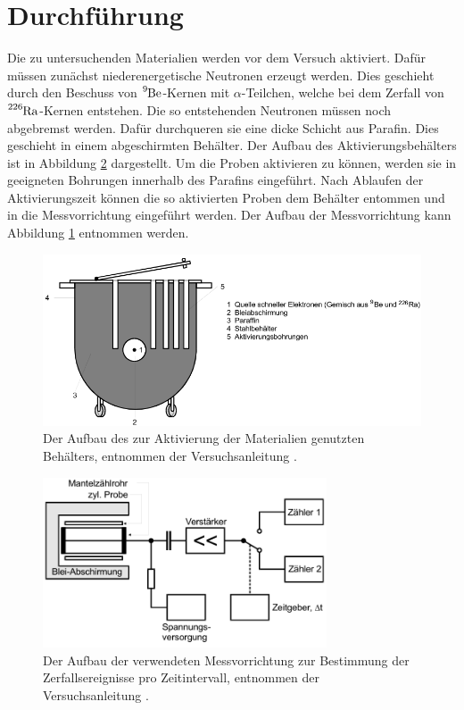 \section{Durchführung}
\label{sec:Durchführung}

Die zu untersuchenden Materialien werden vor dem Versuch aktiviert.
Dafür müssen zunächst niederenergetische Neutronen erzeugt werden.
Dies geschieht durch den Beschuss von $\ce{^{9}Be}$-Kernen mit $\alpha$-Teilchen, welche bei dem Zerfall von $\ce{^{226}Ra}$-Kernen entstehen.
Die so entstehenden Neutronen müssen noch abgebremst werden.
Dafür durchqueren sie eine dicke Schicht aus Parafin.
Dies geschieht in einem abgeschirmten Behälter.
Der Aufbau des Aktivierungsbehälters ist in Abbildung \ref{fig:Aktivierungsbehälter} dargestellt.
Um die Proben aktivieren zu können, werden sie in geeigneten Bohrungen innerhalb des Parafins eingeführt.
Nach Ablaufen der Aktivierungszeit können die so aktivierten Proben dem Behälter entommen und in die Messvorrichtung eingeführt werden.
Der Aufbau der Messvorrichtung kann Abbildung \ref{fig:Aufbau} entnommen werden.
\FloatBarrier
\begin{figure}
  \centering
  \includegraphics[width=\textwidth]{images/Aktivierungsbehaelter.png}
  \caption{Der Aufbau des zur Aktivierung der Materialien genutzten Behälters, entnommen der Versuchsanleitung \cite[4]{sample}.}
  \label{fig:Aufbau}
\end{figure}
\begin{figure}
  \centering
  \includegraphics[width=0.75\textwidth]{images/Aufbau.png}
  \caption{Der Aufbau der verwendeten Messvorrichtung zur Bestimmung der Zerfallsereignisse pro Zeitintervall, entnommen der Versuchsanleitung \cite[8]{sample}.}
  \label{fig:Aktivierungsbehälter}
\end{figure}
